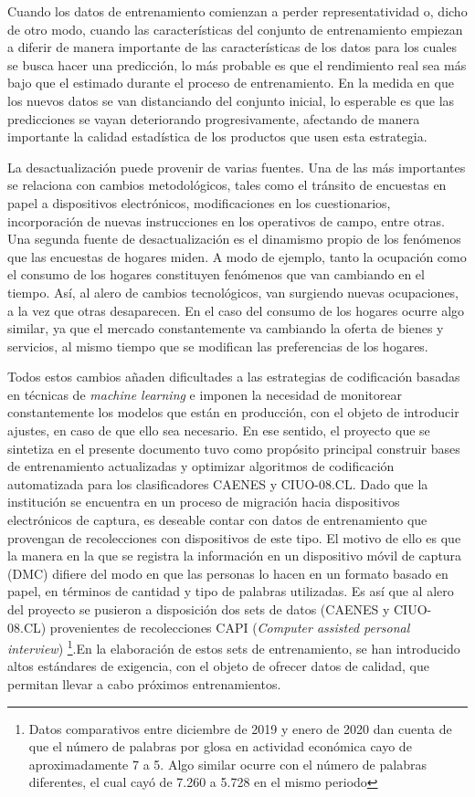\documentclass[
  12pt,
  spanish,
]{article}
\begin{document}
Cuando los datos de entrenamiento comienzan a perder representatividad
o, dicho de otro modo, cuando las características del conjunto de
entrenamiento empiezan a diferir de manera importante de las
características de los datos para los cuales se busca hacer una
predicción, lo más probable es que el rendimiento real sea más bajo que
el estimado durante el proceso de entrenamiento. En la medida en que los
nuevos datos se van distanciando del conjunto inicial, lo esperable es
que las predicciones se vayan deteriorando progresivamente, afectando de
manera importante la calidad estadística de los productos que usen esta
estrategia.

La desactualización puede provenir de varias fuentes. Una de las más
importantes se relaciona con cambios metodológicos, tales como el
tránsito de encuestas en papel a dispositivos electrónicos,
modificaciones en los cuestionarios, incorporación de nuevas
instrucciones en los operativos de campo, entre otras. Una segunda
fuente de desactualización es el dinamismo propio de los fenómenos que
las encuestas de hogares miden. A modo de ejemplo, tanto la ocupación
como el consumo de los hogares constituyen fenómenos que van cambiando
en el tiempo. Así, al alero de cambios tecnológicos, van surgiendo
nuevas ocupaciones, a la vez que otras desaparecen. En el caso del
consumo de los hogares ocurre algo similar, ya que el mercado
constantemente va cambiando la oferta de bienes y servicios, al mismo
tiempo que se modifican las preferencias de los hogares.

Todos estos cambios añaden dificultades a las estrategias de
codificación basadas en técnicas de \emph{machine learning} e imponen la
necesidad de monitorear constantemente los modelos que están en
producción, con el objeto de introducir ajustes, en caso de que ello sea
necesario. En ese sentido, el proyecto que se sintetiza en el presente
documento tuvo como propósito principal construir bases de entrenamiento
actualizadas y optimizar algoritmos de codificación automatizada para
los clasificadores CAENES y CIUO-08.CL. Dado que la institución se
encuentra en un proceso de migración hacia dispositivos electrónicos de
captura, es deseable contar con datos de entrenamiento que provengan de
recolecciones con dispositivos de este tipo. El motivo de ello es que la
manera en la que se registra la información en un dispositivo móvil de
captura (DMC) difiere del modo en que las personas lo hacen en un
formato basado en papel, en términos de cantidad y tipo de palabras
utilizadas. Es así que al alero del proyecto se pusieron a disposición
dos sets de datos (CAENES y CIUO-08.CL) provenientes de recolecciones
CAPI (\emph{Computer assisted personal interview})
\footnote{Datos comparativos entre diciembre de 2019 y enero de 2020  dan cuenta de que el número de palabras por glosa en actividad económica cayo de aproximadamente 7 a 5. Algo similar ocurre con el número de palabras diferentes, el cual cayó de 7.260 a 5.728 en el mismo periodo}.En
la elaboración de estos sets de entrenamiento, se han introducido altos
estándares de exigencia, con el objeto de ofrecer datos de calidad, que
permitan llevar a cabo próximos entrenamientos.
\end{document}
